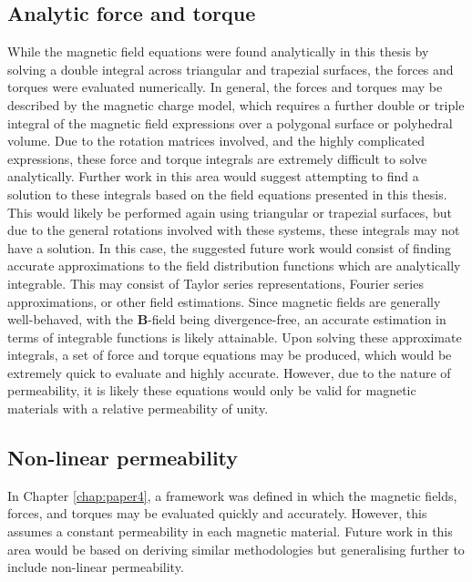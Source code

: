 \subsection{Analytic force and torque}
While the magnetic field equations were found analytically in this thesis by solving a double integral across triangular and trapezial surfaces, the forces and torques were evaluated numerically. In general, the forces and torques may be described by the magnetic charge model, which requires a further double or triple integral of the magnetic field expressions over a polygonal surface or polyhedral volume. Due to the rotation matrices involved, and the highly complicated expressions, these force and torque integrals are extremely difficult to solve analytically. Further work in this area would suggest attempting to find a solution to these integrals based on the field equations presented in this thesis. This would likely be performed again using triangular or trapezial surfaces, but due to the general rotations involved with these systems, these integrals may not have a solution. In this case, the suggested future work would consist of finding accurate approximations to the field distribution functions which are analytically integrable. This may consist of Taylor series representations, Fourier series approximations, or other field estimations. Since magnetic fields are generally well-behaved, with the \(\mathbf{B}\)-field being divergence-free, an accurate estimation in terms of integrable functions is likely attainable. Upon solving these approximate integrals, a set of force and torque equations may be produced, which would be extremely quick to evaluate and highly accurate. However, due to the nature of permeability, it is likely these equations would only be valid for magnetic materials with a relative permeability of unity.

\subsection{Non-linear permeability}
In Chapter \ref{chap:paper4}, a framework was defined in which the magnetic fields, forces, and torques may be evaluated quickly and accurately. However, this assumes a constant permeability in each magnetic material. Future work in this area would be based on deriving similar methodologies but generalising further to include non-linear permeability.

